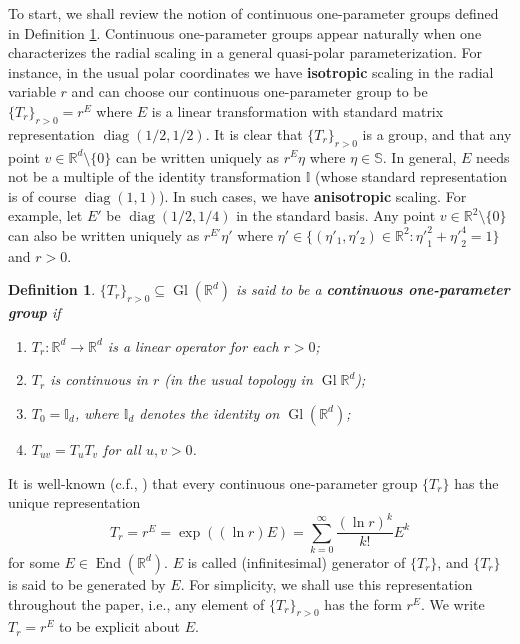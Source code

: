 \documentclass[11pt, letter]{book}
\newtheorem{definition}[theorem]{Definition}
\newcommand\End{\operatorname{End}} %
\newcommand\Gl{\operatorname{Gl}} %
\newcommand\diag{\operatorname{diag}}
\begin{document}
\noindent To start, we shall review the notion of continuous one-parameter groups defined in Definition \ref{def:cont_one_param_group}. Continuous one-parameter groups appear naturally when one characterizes the radial scaling in a general quasi-polar parameterization. For instance, in the usual polar coordinates we have \textbf{isotropic} scaling in the radial variable $r$ and can choose our continuous one-parameter group to be $\{T_r \}_{r>0} = r^E$ where $E$ is a linear transformation with standard matrix representation $\diag(1/2, 1/2)$. It is clear that $\{T_r \}_{r>0}$ is a group, and that any point $v\in \mathbb{R}^d \setminus \{0\}$ can be written uniquely as $r^E \eta$ where $\eta\in \mathbb{S}$. In general, $E$ needs not be a multiple of the identity transformation $\mathbb{I}$ (whose standard representation is of course $\diag(1,1)$). In such cases, we have \textbf{anisotropic} scaling. For example, let $E'$ be $\diag(1/2, 1/4)$ in the standard basis. Any point $v\in \mathbb{R}^2\setminus\{0\}$ can also be written uniquely as $r^{E'}\eta'$ where $\eta' \in \{ (\eta'_1,\eta'_2) \in \mathbb{R}^2 : {\eta'}_1^{2} + {\eta'}_2^{4} = 1  \}$ and $r> 0$. 

\begin{framed}
\begin{definition}\label{def:cont_one_param_group}
$\{T_r \}_{r>0} \subseteq \Gl{(\mathbb{R}^d)}$ is said to be a \textbf{continuous one-parameter group} if
\begin{enumerate}
    \item $T_r : \mathbb{R}^d \to \mathbb{R}^d$ is a linear operator for each $r>0$;
    \item $T_r$ is continuous in $r$ (in the usual topology in $\Gl{\mathbb{R}^d}$);    
    \item $T_0 = \mathbb{I}_d$, where $\mathbb{I}_d$ denotes the identity on $\Gl{(\mathbb{R}^d)}$;
    \item $T_{uv} = T_u T_v$ for all $u,v >0$. 
\end{enumerate}
\end{definition}
\end{framed}
\noindent It is well-known (c.f., \cite{randles_convolution_2017,engel_one-parameter_2000,engel_short_2006}) that every continuous one-parameter group $\{T_r\}$ has the unique representation
\begin{equation*}
T_r=r^E=\exp((\ln r) E)=\sum_{k=0}^\infty \frac{(\ln r)^k}{k!}E^k
\end{equation*}
for some $E\in\End(\mathbb{R}^d)$. $E$ is called (infinitesimal) generator of $\{T_r\}$, and $\{T_r\}$ is said to be generated by $E$. For simplicity, we shall use this representation throughout the paper, i.e., any element of $\{T_r \}_{r>0}$ has the form $r^E$. We write $T_r= r^E$ to be explicit about $E$.\\
\end{document}

